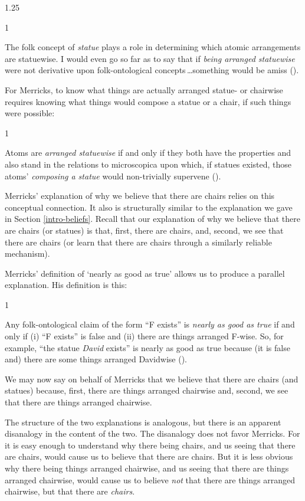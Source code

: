 \documentclass[11pt]{article}
\newenvironment{squote}{%
\begin{spacing}{1}
       	\begin{list}{}{%
\setlength{\labelwidth}{0pt}%
\rightmargin\leftmargin%
}
\item\relax
}{%
\end{list}%
\end{spacing}
}
\begin{document}
\begin{spacing}{1.25}
\begin{squote}
The folk concept of \emph{statue} plays a role in determining which
atomic arrangements are statuewise. I would even go so far as to say
that if \emph{being arranged statuewise} were not derivative upon
folk-ontological concepts\,\ldots something would be amiss
(\citeyear[8]{merricks2001a}).
\end{squote}

For Merricks, to know what things are actually arranged statue- or
chairwise requires knowing what things would compose a statue or a
chair, if such things were possible:

\begin{squote}
Atoms are \emph{arranged statuewise} if and only if they both have the
properties and also stand in the relations to microscopica upon which,
if statues existed, those atoms' \emph{composing a statue} would
non-trivially supervene (\citeyear[4]{merricks2001a}).
\end{squote}

Merricks' explanation of why we believe that there are chairs relies
on this conceptual connection.  It also is structurally similar to the
explanation we gave in Section \ref{intro-beliefs}.  Recall that our
explanation of why we believe that there are chairs (or statues) is
that, first, there are chairs, and, second, we see that there are
chairs (or learn that there are chairs through a similarly reliable
mechanism).

Merricks' definition of `nearly as good as true' allows us to produce
a parallel explanation.  His definition is this:

\begin{squote}
Any folk-ontological claim of the form ``F exists'' is \emph{nearly as
  good as true} if and only if (i) ``F exists'' is false and (ii)
there are things arranged F-wise. So, for example, ``the statue
\emph{David} exists'' is nearly as good as true because (it is false
and) there are some things arranged Davidwise
(\citeyear[171]{merricks2001a}).
\end{squote}

We may now say on behalf of Merricks that we believe that there are
chairs (and statues) because, first, there are things arranged
chairwise and, second, we see that there are things arranged
chairwise.

The structure of the two explanations is analogous, but there is an
apparent disanalogy in the content of the two.  The disanalogy does
not favor Merricks.  For it is easy enough to understand why there
being chairs, and us seeing that there are chairs, would cause us to
believe that there are chairs.  But it is less obvious why there being
things arranged chairwise, and us seeing that there are things
arranged chairwise, would cause us to believe {\em not} that there are
things arranged chairwise, but that there are {\em chairs}.


\end{spacing}
\end{document}
